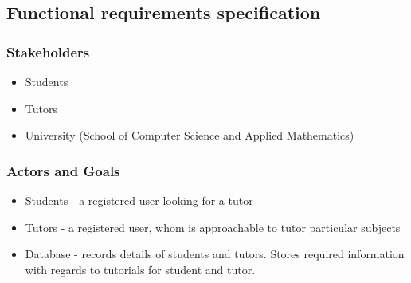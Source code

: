 \documentclass[12pt]{article}
\begin{document}
\subsection{Functional requirements specification}
\subsubsection{Stakeholders}
\begin{itemize}
\item Students
\item Tutors
\item University (School of Computer Science and Applied Mathematics)
\end{itemize}
\subsubsection{Actors and Goals}
\begin{itemize}
\item Students - a registered user looking for a tutor
\item Tutors - a registered user, whom is approachable to tutor particular subjects
\item Database - records details of students and tutors. Stores required information with regards to tutorials for student and tutor. 
\end{itemize}
\end{document}
